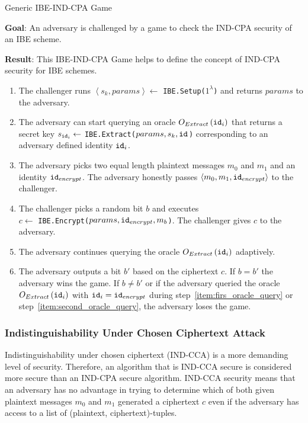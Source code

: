 \begin{algorithm}
\caption{Generic IBE-IND-CPA Game~\cite{thesis:Alfredo08}}
\label{alg:ind_cpa_game}
 \textbf{Goal}: An adversary is challenged by a game to check the IND-CPA security of an IBE scheme.
 
 \textbf{Result}: This IBE-IND-CPA Game helps to define the concept of IND-CPA security for IBE schemes.

 \begin{enumerate}
  \item The challenger runs $\left< s_k, params\right> \leftarrow$ \texttt{IBE.Setup($1^{\lambda}$)} and returns $params$ to the adversary.
  \item \label{item:firs_oracle_query} The adversary can start querying an oracle $O_{Extract} \left( \mathtt{id}_{i} \right)$ that returns a secret key $s_{\mathtt{id}_{i}} \leftarrow$ \texttt{IBE.Extract($params, s_k, \mathtt{id}_{}$)} corresponding to an adversary defined identity $\mathtt{id}_{i}$.
  \item The adversary picks two equal length plaintext messages $m_0$ and $m_1$ and an identity $\mathtt{id}_{encrypt}$. The adversary honestly passes $\left< m_0, m_1, \mathtt{id}_{encrypt} \right>$ to the challenger.
  \item The challenger picks a random bit $b$ and executes \\ $c \leftarrow$ \texttt{IBE.Encrypt($params, \mathtt{id}_{encrypt}, m_b$)}. The challenger gives $c$ to the adversary.
  \item \label{item:second_oracle_query} The adversary continues querying the oracle $O_{Extract} \left( \mathtt{id}_{i} \right)$ adaptively.
  \item The adversary outputs a bit $b'$ based on the ciphertext $c$. If $b = b'$ the adversary wins the game. If $b \neq b'$ or if the adversary queried the oracle $O_{Extract} \left( \mathtt{id}_{i} \right)$ with $\mathtt{id}_{i} = \mathtt{id}_{encrypt}$ during step~\ref{item:firs_oracle_query} or step~\ref{item:second_oracle_query}, the adversary loses the game.
 \end{enumerate}
\end{algorithm}

\subsubsection{Indistinguishability Under Chosen Ciphertext Attack}
Indistinguishability under chosen ciphertext (IND-CCA) is a more demanding level of security. Therefore, an algorithm that is IND-CCA secure is considered more secure than an IND-CPA secure algorithm. IND-CCA security means that an adversary has no advantage in trying to determine which of both given plaintext messages $m_0$ and $m_1$ generated a ciphertext $c$ even if the adversary has access to a list of (plaintext, ciphertext)-tuples.

